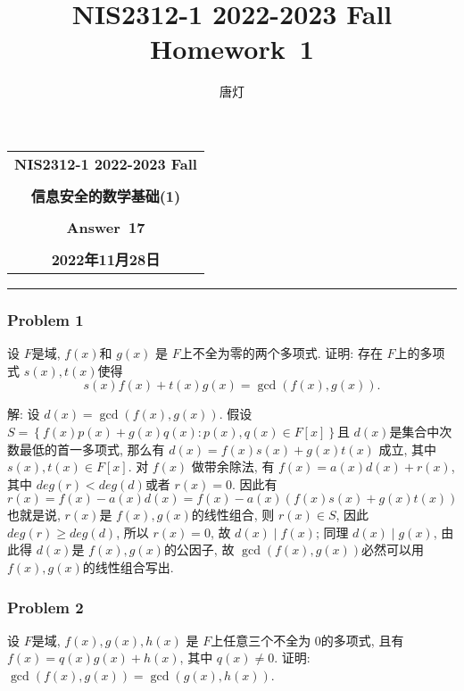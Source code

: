 \documentclass[a4paper,12pt]{ctexart}
\title{NIS2312-1 2022-2023 Fall Homework~1}
\author{唐灯}
\begin{document}
  \begin{center}

  \vspace{-0.3in}
  \begin{tabular}{c}
    \textbf{\Large NIS2312-1 2022-2023 Fall} \\
    \textbf{\Large  } \\
    \textbf{\Large  信息安全的数学基础(1)} \\
    \textbf{\Large  } \\
    \textbf{\Large  Answer~17} \\
    \textbf{\Large  } \\
    \textbf{\Large 2022年11月28日} \\
  \end{tabular}
  \end{center}
  \noindent
  \rule{\linewidth}{0.4pt}
  

\subsubsection*{Problem 1}
    设 $ F $是域,  $ f(x) $和 $ g(x) $ 是 $ F $上不全为零的两个多项式. 证明: 存在 $ F $上的多项式 $ s(x),t(x) $使得 
    \[s(x)f(x)+t(x)g(x)=\gcd(f(x),g(x)).\]
 
    解:  设 $ d(x)=\gcd(f(x),g(x)) $. 
    假设 $ S=\left\{ f(x)p(x)+g(x)q(x):p(x),q(x)\in F[x] \right\} $且 $ d(x) $是集合中次数最低的首一多项式, 
    那么有 $ d(x)=f(x)s(x)+g(x)t(x) $ 成立, 其中 $ s(x),t(x)\in F[x] $. 对 $ f(x) $ 做带余除法, 有 
    $ f(x)=a(x)d(x)+r(x) $, 其中 $ deg(r)<deg(d) $或者 $ r(x)=0 $. 因此有
    \[r(x)=f(x)-a(x)d(x)=f(x)-a(x)\left( f(x)s(x)+g(x)t(x) \right)\]
    也就是说, $ r(x) $是 $ f(x),g(x) $的线性组合, 则 $ r(x)\in S $, 因此 $ deg(r)\ge deg(d) $, 所以 $ r(x)=0 $, 故 $ d(x)\mid f(x) $; 
    同理 $ d(x)\mid g(x) $, 由此得 $ d(x) $是 $ f(x),g(x) $的公因子, 故 $ \gcd(f(x),g(x)) $必然可以用 $ f(x),g(x) $的线性组合写出.

\subsubsection*{Problem 2} 
    设 $ F $是域, $ f(x),g(x),h(x) $ 是 $ F $上任意三个不全为 $ 0 $的多项式, 且有 $ f(x)=q(x)g(x)+h(x) $, 其中 $ q(x)\ne 0 $. 
    证明: $ \gcd(f(x),g(x))=\gcd(g(x),h(x)) $.
\end{document}
